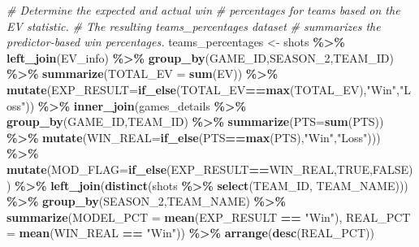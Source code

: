 \documentclass[
  12pt,
  a4paper,
]{article}
\newenvironment{Shaded}{\begin{snugshade}}{\end{snugshade}}
\newcommand{\AttributeTok}[1]{\textcolor[rgb]{0.13,0.29,0.53}{#1}}
\newcommand{\CommentTok}[1]{\textcolor[rgb]{0.56,0.35,0.01}{\textit{#1}}}
\newcommand{\ConstantTok}[1]{\textcolor[rgb]{0.56,0.35,0.01}{#1}}
\newcommand{\FunctionTok}[1]{\textcolor[rgb]{0.13,0.29,0.53}{\textbf{#1}}}
\newcommand{\NormalTok}[1]{#1}
\newcommand{\OtherTok}[1]{\textcolor[rgb]{0.56,0.35,0.01}{#1}}
\newcommand{\SpecialCharTok}[1]{\textcolor[rgb]{0.81,0.36,0.00}{\textbf{#1}}}
\newcommand{\StringTok}[1]{\textcolor[rgb]{0.31,0.60,0.02}{#1}}
\begin{document}
\begin{Shaded}
\begin{Highlighting}[]
\CommentTok{\# Determine the expected and actual win}
\CommentTok{\# percentages for teams based on the EV statistic.}
\CommentTok{\# The resulting teams\_percentages dataset}
\CommentTok{\# summarizes the predictor{-}based win percentages.}
\NormalTok{teams\_percentages }\OtherTok{\textless{}{-}}\NormalTok{ shots }\SpecialCharTok{\%\textgreater{}\%}
  \FunctionTok{left\_join}\NormalTok{(EV\_info) }\SpecialCharTok{\%\textgreater{}\%}
  \FunctionTok{group\_by}\NormalTok{(GAME\_ID,SEASON\_2,TEAM\_ID) }\SpecialCharTok{\%\textgreater{}\%}
  \FunctionTok{summarize}\NormalTok{(}\AttributeTok{TOTAL\_EV =} \FunctionTok{sum}\NormalTok{(EV)) }\SpecialCharTok{\%\textgreater{}\%}
  \FunctionTok{mutate}\NormalTok{(}\AttributeTok{EXP\_RESULT=}\FunctionTok{if\_else}\NormalTok{(TOTAL\_EV}\SpecialCharTok{==}\FunctionTok{max}\NormalTok{(TOTAL\_EV),}\StringTok{"Win"}\NormalTok{,}\StringTok{"Loss"}\NormalTok{)) }\SpecialCharTok{\%\textgreater{}\%}
  \FunctionTok{inner\_join}\NormalTok{(games\_details }\SpecialCharTok{\%\textgreater{}\%}
    \FunctionTok{group\_by}\NormalTok{(GAME\_ID,TEAM\_ID) }\SpecialCharTok{\%\textgreater{}\%}
    \FunctionTok{summarize}\NormalTok{(}\AttributeTok{PTS=}\FunctionTok{sum}\NormalTok{(PTS)) }\SpecialCharTok{\%\textgreater{}\%}
    \FunctionTok{mutate}\NormalTok{(}\AttributeTok{WIN\_REAL=}\FunctionTok{if\_else}\NormalTok{(PTS}\SpecialCharTok{==}\FunctionTok{max}\NormalTok{(PTS),}\StringTok{"Win"}\NormalTok{,}\StringTok{"Loss"}\NormalTok{))) }\SpecialCharTok{\%\textgreater{}\%}
  \FunctionTok{mutate}\NormalTok{(}\AttributeTok{MOD\_FLAG=}\FunctionTok{if\_else}\NormalTok{(EXP\_RESULT}\SpecialCharTok{==}\NormalTok{WIN\_REAL,}\ConstantTok{TRUE}\NormalTok{,}\ConstantTok{FALSE}\NormalTok{)) }\SpecialCharTok{\%\textgreater{}\%}
  \FunctionTok{left\_join}\NormalTok{(}\FunctionTok{distinct}\NormalTok{(shots }\SpecialCharTok{\%\textgreater{}\%} \FunctionTok{select}\NormalTok{(TEAM\_ID, TEAM\_NAME))) }\SpecialCharTok{\%\textgreater{}\%}
  \FunctionTok{group\_by}\NormalTok{(SEASON\_2,TEAM\_NAME) }\SpecialCharTok{\%\textgreater{}\%}
  \FunctionTok{summarize}\NormalTok{(}\AttributeTok{MODEL\_PCT =} \FunctionTok{mean}\NormalTok{(EXP\_RESULT }\SpecialCharTok{==} \StringTok{"Win"}\NormalTok{),}
            \AttributeTok{REAL\_PCT  =} \FunctionTok{mean}\NormalTok{(WIN\_REAL   }\SpecialCharTok{==} \StringTok{"Win"}\NormalTok{)) }\SpecialCharTok{\%\textgreater{}\%}
  \FunctionTok{arrange}\NormalTok{(}\FunctionTok{desc}\NormalTok{(REAL\_PCT))}


\end{Highlighting}
\end{Shaded}
\end{document}
